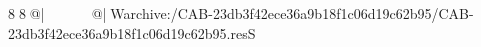 8  8  @|                                                  @| W   archive:/CAB-23db3f42ece36a9b18f1c06d19c62b95/CAB-23db3f42ece36a9b18f1c06d19c62b95.resS 